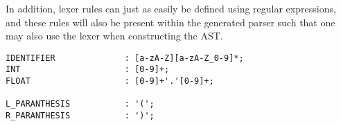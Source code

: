 In addition, lexer rules can just as easily be defined using regular expressions, and these rules will also be present within the generated parser such that one may also use the lexer when constructing the AST.

\begin{lstlisting}[caption={A snippet of few lexer rules for \dazel{}.}, label={lst:GrammarSnippet},escapechar=|]
IDENTIFIER              : [a-zA-Z][a-zA-Z_0-9]*;
INT                     : [0-9]+;
FLOAT                   : [0-9]+'.'[0-9]+;
            
L_PARANTHESIS           : '(';
R_PARANTHESIS           : ')';
\end{lstlisting}